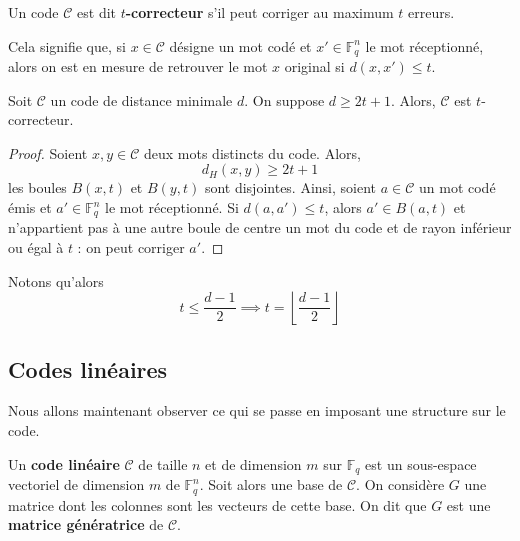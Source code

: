 	\begin{definition}
		Un code $\mathcal{C}$ est dit \textbf{$t$-correcteur} s'il peut corriger au maximum $t$ erreurs.
	\end{definition}
	
	\begin{remark}
		Cela signifie que, si $x \in \mathcal{C}$ désigne un mot codé et $x' \in \mathbb{F}_q^n$ le mot réceptionné, alors on est en mesure de retrouver le mot $x$ original si $d(x,x') \leq t$. 
	\end{remark}
	
	\begin{proposition}
		Soit $\mathcal{C}$ un code de distance minimale $d$. On suppose $d \geq 2t + 1$. Alors, $\mathcal{C}$ est $t$-correcteur.
	\end{proposition}
	
	\begin{proof}
		Soient $x, y \in \mathcal{C}$ deux mots distincts du code. Alors,
		\[ d_H(x,y) \geq 2t+1 \]
		les boules $B(x,t)$ et $B(y,t)$ sont disjointes.
		Ainsi, soient $a \in \mathcal{C}$ un mot codé émis et $a' \in \mathbb{F}_q^n$ le mot réceptionné. Si $d(a,a') \leq t$, alors $a' \in B(a,t)$ et n'appartient pas à une autre boule de centre un mot du code et de rayon inférieur ou égal à $t$ : on peut corriger $a'$.
	\end{proof}
	
	\begin{remark}
		\label{codes-correcteurs-1}
		Notons qu'alors
		\[ t \leq \frac{d-1}{2} \implies t = \left\lfloor \frac{d-1}{2} \right\rfloor \]
	\end{remark}
	
	\subsection{Codes linéaires}
	
	Nous allons maintenant observer ce qui se passe en imposant une structure sur le code.
	
	\begin{definition}
		Un \textbf{code linéaire} $\mathcal{C}$ de taille $n$ et de dimension $m$ sur $\mathbb{F}_q$ est un sous-espace vectoriel de dimension $m$ de $\mathbb{F}_q^n$.
		\newpar
		Soit alors une base de $\mathcal{C}$. On considère $G$ une matrice dont les colonnes sont les vecteurs de cette base. On dit que $G$ est une \textbf{matrice génératrice} de $\mathcal{C}$.
	\end{definition}
	
